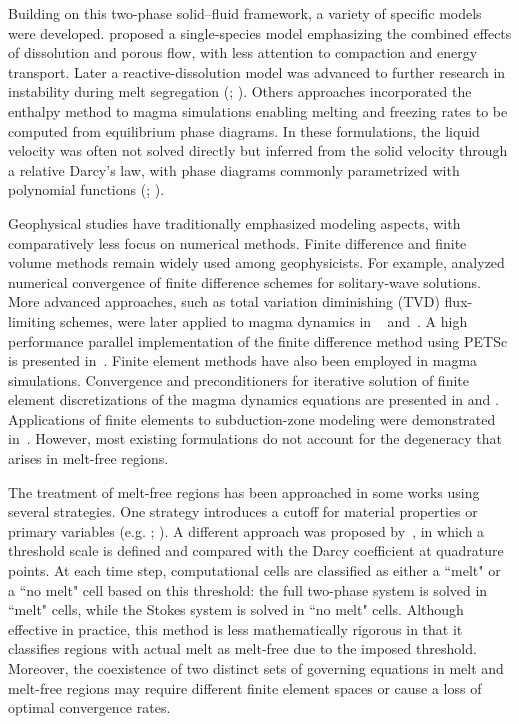 Building on this two-phase solid–fluid framework, a variety of specific models were developed. 
\cite{ChannelingInstability} proposed a single-species model emphasizing the combined effects of dissolution and porous flow, 
with less attention to compaction and energy transport.
Later a reactive-dissolution model was advanced to further research
in instability during melt segregation (\cite{CompactionDissolution};
\cite{highporositychannels}). 
Others approaches incorporated the enthalpy method to magma simulations enabling melting and freezing rates to be computed from 
equilibrium phase diagrams. In these formulations, the liquid velocity was often not solved directly but inferred from the 
solid velocity through a relative Darcy's law,
with phase diagrams commonly parametrized with polynomial functions
(\cite{MagmaDynamicsEnthalpyMethod};
\cite{PartialMeltinginUpwellingMantleColumn}).

Geophysical studies have traditionally emphasized modeling aspects, with comparatively less focus on numerical methods.
Finite difference and finite volume methods remain widely used among geophysicists.
For example, \cite{flowindeformableporousp2} analyzed numerical convergence of finite difference schemes for solitary-wave solutions.
More advanced approaches, such as total variation diminishing (TVD) flux-limiting schemes, were later applied to magma dynamics in
~\cite{10.1111/j.1365-246X.2010.04528.x} and~\cite{KATZ2012226}.
A high performance parallel implementation of the finite difference method using PETSc is presented in~\cite{KATZ200752}.
Finite element methods have also been employed in magma simulations.
Convergence and preconditioners for iterative solution 
of finite element discretizations of the magma dynamics equations are presented in \cite{doi:10.1137/130946678} and 
\cite{doi:10.1137/14099718X}. 
Applications of finite elements to subduction-zone modeling were 
demonstrated in~\cite{WILSON2014261}.
However, most existing formulations do not account for the degeneracy that arises in melt-free regions.

The treatment of melt-free regions has been approached in some works using several strategies. 
One strategy introduces a cutoff for material properties or primary variables 
(e.g. \cite{10.1093/gji/ggt306}; \cite{10.1093/gji/ggw329}). 
A different approach was proposed by~\cite{10.1093/gji/ggz190}, in which a threshold scale is defined and 
compared with the Darcy coefficient at quadrature points. At each time step, computational cells are classified as 
either a ``melt" or a ``no melt" cell based on this threshold: the full two-phase system is solved in ``melt" cells, 
while the Stokes system is solved in ``no melt" cells. Although effective in practice, this method is less 
mathematically rigorous in that it classifies 
regions with actual melt as melt-free due to the imposed threshold.
Moreover, the coexistence of two distinct sets of governing equations in melt and melt-free regions may require different finite element spaces or 
cause a loss of optimal convergence rates.

